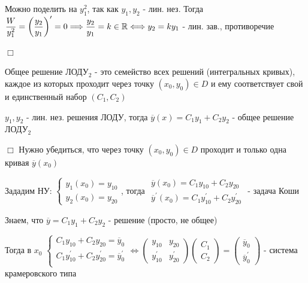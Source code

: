 \documentclass[12pt]{article}
\begin{document}
    Можно поделить на $\displaystyle y_1^2$, так как $\displaystyle y_1, y_2$ - лин. нез. Тогда $\displaystyle \frac{W}{y^2_1} = \left(\frac{y_2}{y_1}\right)^\prime = 0 \Longrightarrow \frac{y_2}{y_1} = k \in \mathbb{R} \Longleftrightarrow y_2 = k y_1$ - лин. зав., противоречие

    $\Box$

    \Nota Общее решение ЛОДУ$\displaystyle _2$ - это семейство всех решений (интегральных кривых), каждое из которых проходит через точку
    $\displaystyle (x_0, y_0) \in D$ и ему соответствует свой и единственный набор $\displaystyle (C_1, C_2)$

     $\displaystyle y_1, y_2$ - лин. нез. решения ЛОДУ, тогда $\displaystyle \overline{y}(x) = C_1 y_1 + C_2 y_2$ - общее решение ЛОДУ$\displaystyle _2$

    $\Box$ Нужно убедиться, что через точку $\displaystyle (x_0, y_0) \in D$ проходит и только одна кривая $\displaystyle \overline{y}(x_0)$

    Зададим НУ: $\displaystyle \begin{cases}
                     y_1(x_0) = y_{10} \\
                     y_2(x_0) = y_{20}
    \end{cases}$, тогда $\displaystyle \begin{matrix}\overline{y}(x_0) = C_1 y_{10} + C_2 y_{20} \\ \overline{y}^\prime(x_0) = C_1 y_{10}^\prime + C_2 y_{20}^\prime\end{matrix}$ - задача Коши

    Знаем, что $\displaystyle \overline{y} = C_1 y_1 + C_2 y_2$ - решение (просто, не общее)

    Тогда в $\displaystyle x_0$ $\displaystyle \begin{cases}
                       C_1 y_{10} + C_2 y_{20} = \overline{y}_0 \\
                       C_1 y_{10}^\prime + C_2 y_{20}^\prime = \overline{y}_0^\prime \\
    \end{cases} \Longleftrightarrow \begin{pmatrix}y_{10} & y_{20} \\ y_{10}^\prime & y_{20}^\prime \end{pmatrix} \begin{pmatrix}C_1 \\ C_2\end{pmatrix} = \begin{pmatrix}\overline{y}_0 \\ \overline{y}^\prime_0\end{pmatrix}$ -
    система крамеровского типа
\end{document}
